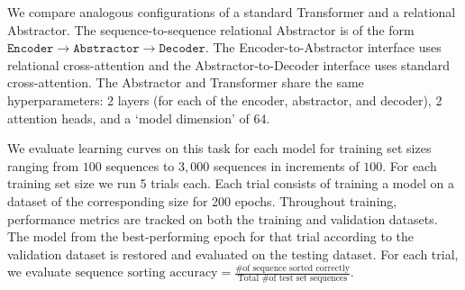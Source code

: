  We compare analogous configurations of a standard Transformer and a relational Abstractor. The sequence-to-sequence relational Abstractor is of the form $\texttt{Encoder} \to \texttt{Abstractor} \to \texttt{Decoder}$. The Encoder-to-Abstractor interface uses relational cross-attention and the Abstractor-to-Decoder interface uses standard cross-attention. The Abstractor and Transformer share the same hyperparameters: 2 layers (for each of the encoder, abstractor, and decoder), 2 attention heads, and a `model dimension' of 64.

 We evaluate learning curves on this task for each model for training set
sizes ranging from $
100$ sequences to $3,000$ sequences in increments of $100$. For each training set size we run 5 trials each. Each trial consists of training a model on a dataset of the corresponding size for 200 epochs. Throughout training, performance metrics are tracked on both the training and validation datasets. The model from the best-performing epoch for that trial according to the validation dataset is restored and evaluated on the testing dataset. For each trial, we evaluate $\text{sequence sorting accuracy} = \frac{\text{\# of sequence sorted correctly}}{\text{Total \# of test set sequences}}$.

